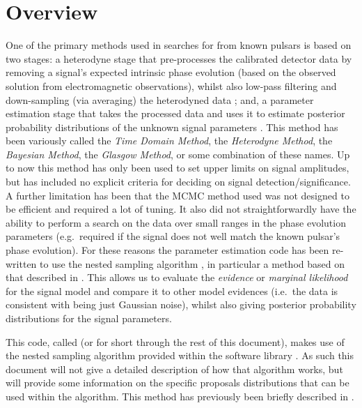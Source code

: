 \section{Overview}

One of the primary methods used in searches for \gws from known pulsars is based on two stages: a heterodyne
stage that pre-processes the calibrated \gw detector data by removing a signal's expected intrinsic phase
evolution (based on the observed solution from electromagnetic observations), whilst also low-pass filtering and
down-sampling (via averaging) the heterodyned data \citep{2005PhRvD..72j2002D}; and, a parameter estimation stage that takes the
processed data and uses it to estimate posterior probability distributions of the unknown signal parameters
\citep[e.g.\ using a Markov chain Monte Carlo (MCMC)][]{2010ApJ...713..671A}. This method has been variously
called the {\it Time Domain Method}, the {\it Heterodyne Method}, the {\it Bayesian Method}, the {\it Glasgow
Method}, or some combination of these names. Up to now this method has only been used to set upper limits
on signal amplitudes, but has included no explicit criteria for deciding on signal detection/significance. A further
limitation has been that the MCMC method used was not designed to be efficient and required a lot of tuning. It also
did not straightforwardly have the ability to perform a search on the data over small ranges in the phase
evolution parameters (e.g.\ required if the
\gw signal does not well match the known pulsar's phase evolution). For these reasons the parameter
estimation code has been re-written to use the nested sampling algorithm \citep{Skilling:2006}, in particular
a method based on that described in \citet{Veitch:2010}. This allows us to evaluate the {\it evidence} or {\it
marginal likelihood} for the signal model and compare it to other model evidences (i.e.\ the data is consistent with being just
Gaussian noise), whilst also giving posterior probability distributions for the signal parameters.

This code, called \lppenf (or \lppen for short through the rest of this document), makes use of the nested sampling
algorithm provided within the \lalinf software library \citep{2015PhRvD..91d2003V}. As such this document will not
give a detailed description of how that algorithm works, but will provide some information on the specific proposals
distributions that can be used within the algorithm. This method has previously been briefly described in \citet{2012JPhCS.363a2041P}.

